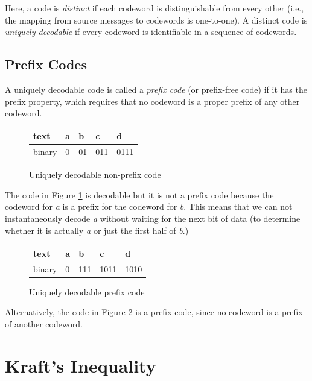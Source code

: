 \documentclass[11pt]{article}
\begin{document}
Here, a code is \textit{distinct} if each codeword is distinguishable from every other (i.e., the mapping from source messages to codewords is one-to-one). A distinct code is \textit{uniquely decodable} if every codeword is identifiable in a sequence of codewords. 

\subsection{Prefix Codes}
A uniquely decodable code is called a \textit{prefix code} (or prefix-free code) if it has the prefix property, which requires that no codeword is a proper prefix of any other codeword.

\begin{figure}[h!]
\begin{center}
\begin{tabular}{| l | l | l | l | l |}
 \hline
  text   & a & b & c & d \\ \hline
  binary & 0 & 01 & 011 & 0111 \\ 
  \hline
\end{tabular}
\caption{Uniquely decodable non-prefix code}
\label{table:non_prefix_code}
\end{center}
\end{figure}

The code in Figure \ref{table:non_prefix_code} is decodable but it is not a prefix code because the codeword for \textit{a} is a prefix for the codeword for \textit{b}. This means that we can not instantaneously decode \textit{a} without waiting for the next bit of data (to determine whether it is actually \textit{a} or just the first half of \textit{b}.)

\begin{figure}[h!]
\begin{center}
\begin{tabular}{| l | l | l | l | l |}
 \hline
  text   & a & b & c & d \\ \hline
  binary & 0 & 111 & 1011 & 1010 \\ 
  \hline
\end{tabular}
\caption{Uniquely decodable prefix code}
\label{table:prefix_code}
\end{center}
\end{figure}

Alternatively, the code in Figure \ref{table:prefix_code} is a prefix code, since no codeword is a prefix of another codeword.

\section{Kraft's Inequality}
\end{document}
